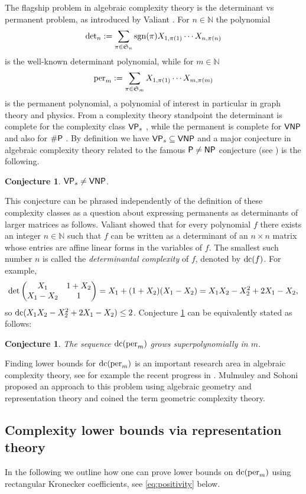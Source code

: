 \documentclass{article}
\numberwithin{equation}{section}
\newtheorem{conjecture}[equation]{Conjecture}
\theoremstyle{definition}
\def\sgn{{\rm sgn}}
\newcommand{\dcorig}{\textup{dc}}
\newcommand{\IN}{\mathbb N}
\renewcommand{\det}{\textup{det}}
\newcommand{\per}{\textup{per}}
\newcommand{\aS}{\ensuremath{\mathfrak{S}}}
\newcommand{\VPs}{\textup{\textsf{VP$_s$}}}
\newcommand{\VNP}{\textup{\textsf{VNP}}}
\newcommand{\sharpP}{\textup{\textsf{\#P}}}
\newcommand{\PP}{\textup{\textsf{P}}}
\newcommand{\NP}{\textup{\textsf{NP}}}
\begin{document}
The flagship problem in algebraic complexity theory is the determinant vs permanent problem,
as introduced by Valiant \cite{Val:79b}.
For $n \in \IN$ the polynomial
\[
\det_n := \sum_{\pi \in \aS_n} \sgn(\pi) X_{1,\pi(1)} \cdots X_{n,\pi(n)}
\]
is the well-known determinant polynomial, while for $m \in \IN$
\[
\per_m := \sum_{\pi \in \aS_m} X_{1,\pi(1)} \cdots X_{m,\pi(m)}
\]
is the permanent polynomial, a polynomial of interest in particular in graph theory and physics.
From a complexity theory standpoint the determinant is complete for the complexity class $\VPs$ \cite{Val:79b,toda:92,mapo:08},
while the permanent is complete for $\VNP$ \cite{Val:79b} and also for $\sharpP$ \cite{val:79}.
By definition we have $\VPs \subseteq \VNP$ and a major conjecture in algebraic complexity theory
related to the famous $\PP \neq \NP$ conjecture (see \cite{Coo:00}) is the following.
\begin{conjecture}\label{conj:flagshipconj}
$\VPs \neq \VNP$.
\end{conjecture}
This conjecture can be phrased independently of the definition of these complexity classes
as a question about expressing permanents as determinants of larger matrices as follows.
Valiant showed that for every polynomial $f$
there exists an integer $n \in \IN$
such that $f$ can be written as a determinant of an $n \times n$ matrix whose entries are
affine linear forms in the variables of $f$.
The smallest such number $n$ is called the \emph{determinantal complexity} of $f$, denoted by $\dcorig(f)$.
For example,
\[
\det\begin{pmatrix}
X_1 & 1 + X_2 \\
X_1 - X_2 & 1
\end{pmatrix} = X_1 +(1+X_2)(X_1-X_2) = X_1 X_2 - X_2^2 + 2 X_1 - X_2,
\]
so $\dcorig(X_1 X_2 - X_2^2 + 2 X_1 - X_2) \leq 2$.
Conjecture \ref{conj:flagshipconj} can be equivalently stated as follows:
\begin{conjecture}
The sequence $\dcorig(\per_m)$ grows superpolynomially in $m$.
\end{conjecture}
Finding lower bounds for $\dcorig(\per_m)$
is an important research area in algebraic complexity theory,
see for example the recent progress in \cite{MR:04, CCD:10, lamare:10, HI:14, abv:15, Yabe:15}.
Mulmuley and Sohoni \cite{muso:01,gct2} proposed an approach to this problem
using algebraic geometry and representation theory
and coined the term geometric complexity theory.



\subsection{Complexity lower bounds via representation theory}\label{subsec:compllowboundsrepth}
In the following we outline how one can prove lower bounds on $\dcorig(\per_m)$ using rectangular Kronecker coefficients,
see \eqref{eq:positivity} below.
\end{document}
